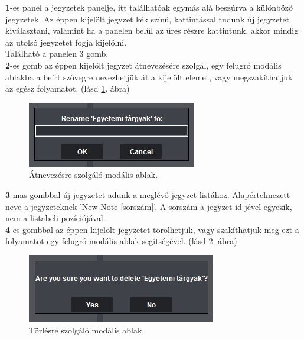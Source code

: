 \vspace{5pt} \noindent \textbf{1}-es panel a jegyzetek panelje, itt találhatóak egymás alá beszúrva a különböző jegyzetek. Az éppen kijelölt jegyzet kék színű, kattintással tudunk új jegyzetet kiválasztani, valamint ha a panelen belül az üres részre kattintunk, akkor mindig az utolsó jegyzetet fogja kijelölni.
\newline \\ Található a panelen 3 gomb. 
\vspace{5pt} \\ \textbf{2}-es gomb az éppen kijelölt jegyzet átnevezésére szolgál, egy felugró modális ablakba a beírt szövegre nevezhetjük át a kijelölt elemet, vagy megszakíthatjuk az egész folyamatot. (lásd \ref{fig:menu_notes_rename}. ábra)

\begin{figure}[h]
	\centering
	\includegraphics[scale=0.6]{images/doc_2.png}
	\caption{Átnevezésre szolgáló modális ablak.}
	\label{fig:menu_notes_rename}
\end{figure}

\vspace{5pt} \noindent \textbf{3}-mas gombbal új jegyzetet adunk a meglévő jegyzet listához. Alapértelmezett neve a jegyzeteknek ’New Note [sorszám]’. A sorszám a jegyzet id-jével egyezik, nem a listabeli pozíciójával.
\vspace{5pt} \\ \textbf{4}-es gombbal az éppen kijelölt jegyzetet törölhetjük, vagy szakíthatjuk meg ezt a folyamatot egy felugró modális ablak segítségével. (lásd \ref{fig:menu_notes_delete}. ábra)

\begin{figure}[h]
	\centering
	\includegraphics[scale=0.6]{images/doc_3.png}
	\caption{Törlésre szolgáló modális ablak.}
	\label{fig:menu_notes_delete}
\end{figure}


